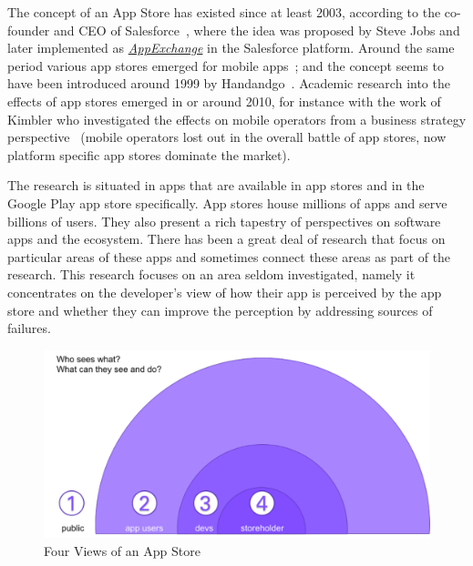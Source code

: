 The concept of an App Store has existed since at least 2003, according to the co-founder and CEO of Salesforce~, where the idea was proposed by Steve Jobs and later implemented as \href{https://appexchange.salesforce.com/}{\emph{AppExchange}} in the Salesforce platform. Around the same period various app stores emerged for mobile apps~; and the concept seems to have been introduced around 1999 by Handandgo~. Academic research into the effects of app stores emerged in or around 2010, for instance with the work of Kimbler who investigated the effects on mobile operators from a business strategy perspective~ (mobile operators lost out in the overall battle of app stores, now platform specific app stores dominate the market). 

The research is situated in apps that are available in app stores and in the Google Play app store specifically. App stores house millions of apps and serve billions of users. They also present a rich tapestry of perspectives on software apps and the ecosystem. There has been a great deal of research that focus on particular areas of these apps and sometimes connect these areas as part of the research. This research focuses on an area seldom investigated, namely it concentrates on the developer's view of how their app is perceived by the app store and whether they can improve the perception by addressing sources of failures.

\begin{figure}
    \includegraphics[width=\linewidth]{images/my/who-sees-what.pdf}
    \caption{Four Views of an App Store}
    \label{fig:4-views-of-apps-in-app-store}
\end{figure}

